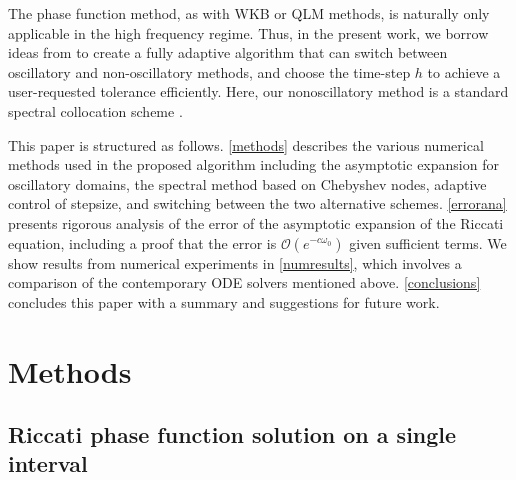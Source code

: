 \documentclass[10pt]{article}
\newcommand{\bigO}{{\mathcal O}}
\newcommand{\om}{\omega}
\newcommand{\AB}[1]{{\color{orange}#1}}
\begin{document}
%
The phase function method, as with WKB or QLM methods,
is naturally only applicable in the high frequency regime.
Thus, in the present work, we borrow ideas from \cite{agocs2020efficient} to
create a fully adaptive algorithm that can switch 
between oscillatory and non-oscillatory methods,
and choose the time-step $h$ to achieve a user-requested
tolerance efficiently.
Here, our nonoscillatory method is a standard spectral collocation scheme
\cite{tref}.  %

This paper is structured as follows. \cref{methods} describes the various
numerical methods used in the proposed algorithm including the asymptotic
expansion for oscillatory domains, the spectral method based on Chebyshev
nodes, adaptive control of stepsize, and switching between the two alternative
schemes.
\cref{errorana} presents rigorous analysis of the error of
the asymptotic expansion of the Riccati equation,
including a proof that the error is $\bigO(e^{-c\om_0})$ given sufficient terms.
We show results from numerical experiments in
\cref{numresults}, which involves a comparison of the contemporary ODE solvers
mentioned above. \cref{conclusions} concludes this paper with a summary and
suggestions for future work.


\section{Methods \label{methods}}

\subsection{Riccati phase function solution on a
  single interval \label{phasefun}}

\end{document}
